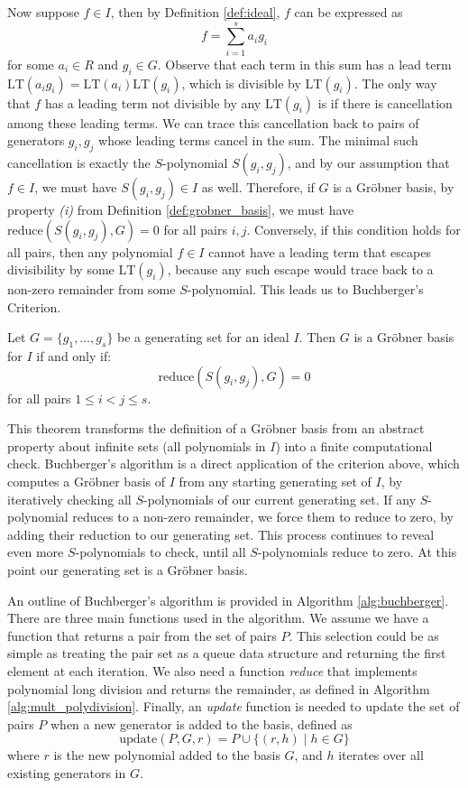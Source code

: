 Now suppose $f \in I$, then by Definition \ref{def:ideal}, $f$ can be expressed as
$$ f = \sum_{i=1}^{s} a_i g_i $$
for some $a_i \in R$ and $g_i \in G$. Observe that each term in this sum has a lead term $\text{LT}(a_i g_i) = \text{LT}(a_i) \text{LT}(g_i)$, which is divisible by $\text{LT}(g_i)$. The only way that $f$ has a leading term not divisible by any $\text{LT}(g_i)$ is if there is cancellation among these leading terms. We can trace this cancellation back to pairs of generators $g_i, g_j$ whose leading terms cancel in the sum. The minimal such cancellation is exactly the $S$-polynomial $S(g_i, g_j)$, and by our assumption that $f \in I$, we must have $S(g_i, g_j) \in I$ as well. Therefore, if $G$ is a Gröbner basis, by property \textit{(i)} from Definition \ref{def:grobner_basis}, we must have $\text{reduce}(S(g_i, g_j), G) = 0$ for all pairs $i, j$. Conversely, if this condition holds for all pairs, then any polynomial $f \in I$ cannot have a leading term that escapes divisibility by some $\text{LT}(g_i)$, because any such escape would trace back to a non-zero remainder from some $S$-polynomial. This leads us to Buchberger's Criterion.


\begin{theorem}
\label{thm:buchberger_criterion}
Let $G = \{g_1, \dots, g_s\}$ be a generating set for an ideal $I$. Then $G$ is a Gröbner basis for $I$ if and only if:
$$
\text{reduce}(S(g_i, g_j), G) = 0
$$
for all pairs $1 \le i < j \le s$.
\end{theorem}

This theorem transforms the definition of a Gröbner basis from an abstract property about infinite sets (all polynomials in $I$) into a finite computational check. Buchberger's algorithm is a direct application of the criterion above, which computes a Gröbner basis of $I$ from any starting generating set of $I$, by iteratively checking all $S$-polynomials of our current generating set. If any $S$-polynomial reduces to a non-zero remainder, we force them to reduce to zero, by adding their reduction to our generating set. This process continues to reveal even more $S$-polynomials to check, until all $S$-polynomials reduce to zero. At this point our generating set is a Gröbner basis.

An outline of Buchberger's algorithm is provided in Algorithm \ref{alg:buchberger}. There are three main functions used in the algorithm. We assume we have a function that returns a pair from the set of pairs $P$. This selection could be as simple as treating the pair set as a queue data structure and returning the first element at each iteration. We also need a function \textit{reduce} that implements polynomial long division and returns the remainder, as defined in Algorithm \ref{alg:mult_polydivision}. Finally, an \textit{update} function is needed to update the set of pairs $P$ when a new generator is added to the basis, defined as
$$
\text{update}(P, G, r) = P \cup \{(r, h) \mid h \in G\}
$$
where $r$ is the new polynomial added to the basis $G$, and $h$ iterates over all existing generators in $G$.

